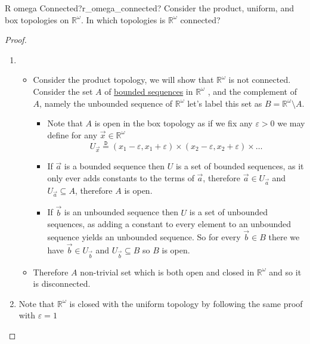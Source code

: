 \begin{example}{R omega Connected?}{r_omega_connected?}
Consider the product, uniform, and box topologies on $\mathbb{R} ^{\omega}$. In which topologies is $\mathbb{R} ^{\omega}$ connected?
\end{example}
\begin{proof}
    \begin{enumerate}
        \item 
        \begin{itemize}
            \item Consider the product topology, we will show that $ \mathbb{R} ^{ \omega  }  $ is not connected. Consider the set $ A $ of \hyperref[definition:bounded_sequence]{bounded sequences} in $ \mathbb{R} ^{ \omega  }  $ , and the complement of $ A $, namely the unbounded sequence of $ \mathbb{R} ^{ \omega  }  $ let's label this set as $ B =  \mathbb{R}  ^{ \omega  } \setminus  A  $.
            \begin{itemize}
                \item Note that $ A $ is open in the box topology as if we fix any $ \varepsilon > 0 $ we may define for any $ \vec{x}  \in  \mathbb{R} ^{ \omega  }  $ 
                    \[
                    U _{ \vec{x}  }  \stackrel{\mathtt{D}}{=} \left( x _{ 1 } -  \varepsilon , x _{ 1 } +  \varepsilon  \right) \times \left( x _{ 2 } -  \varepsilon , x _{ 2 } +  \varepsilon  \right) \times \ldots
                    \]
                \item If $ \vec{a}  $ is a bounded sequence then $ U $ is a set of bounded sequences, as it only ever adds constants to the terms of $ \vec{a}  $, therefore $ \vec{a}  \in  U _{ \vec{a}  } $ and $ U _{ \vec{a}  }  \subseteq A $, therefore $ A $ is open.
                \item If $ \vec{b}  $ is an unbounded sequence then $ U $ is a set of unbounded sequences, as adding a constant to every element to an unbounded sequence yields an unbounded sequence. So for every $ \vec{b} \in  B  $ there we have $ \vec{b} \in  U _{ \vec{b}  }  $ and $ U _{ \vec{b}  } \subseteq B $ so $ B $ is open.
            \end{itemize}
            \item Therefore $ A $ non-trivial set which is both open and closed in $ \mathbb{R} ^{ \omega  }  $ and so it is disconnected.
        \end{itemize}
        \item Note that $ \mathbb{R} ^{ \omega  }  $ is closed with the uniform topology by following the same proof with $ \varepsilon = 1 $ 

\end{enumerate}
\end{proof}
